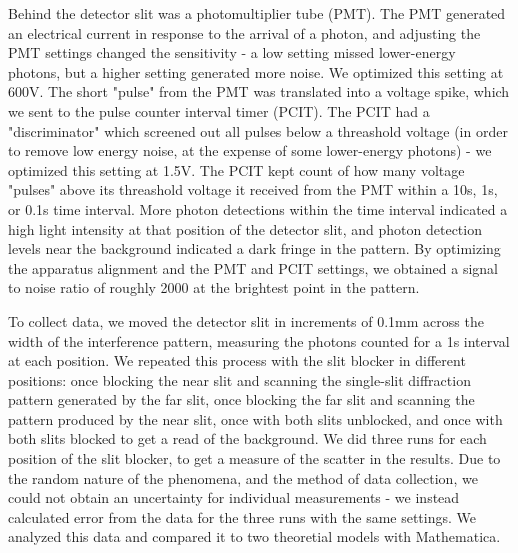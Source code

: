 \documentclass[prb,preprint]{revtex4-1}
\begin{document}
Behind the detector slit was a photomultiplier tube (PMT).  The PMT generated an electrical current in response to the arrival of a photon, and adjusting the PMT settings changed the sensitivity - a low setting missed lower-energy photons, but a higher setting generated more noise.  We optimized this setting at 600V.  The short "pulse" from the PMT was translated into a voltage spike, which we sent to the pulse counter interval timer (PCIT).  The PCIT had a "discriminator" which screened out all pulses below a threashold voltage (in order to remove low energy noise, at the expense of some lower-energy photons) - we optimized this setting at 1.5V. The PCIT kept count of how many voltage "pulses" above its threashold voltage it received from the PMT within a 10s, 1s, or 0.1s time interval. More photon detections within the time interval indicated a high light intensity at that position of the detector slit, and photon detection levels near the background indicated a dark fringe in the pattern. By optimizing the apparatus alignment and the PMT and PCIT settings, we obtained a signal to noise ratio of roughly 2000 at the brightest point in the pattern.  

To collect data, we moved the detector slit in increments of 0.1mm across the width of the interference pattern, measuring the photons counted for a 1s interval at each position.  We repeated this process with the slit blocker in different positions: once blocking the near slit and scanning the single-slit diffraction pattern generated by the far slit, once blocking the far slit and scanning the pattern produced by the near slit, once with both slits unblocked, and once with both slits blocked to get a read of the background.  We did three runs for each position of the slit blocker, to get a measure of the scatter in the results.  Due to the random nature of the phenomena, and the method of data collection, we could not obtain an uncertainty for individual measurements - we instead calculated error from the data for the three runs with the same settings.  We analyzed this data and compared it to two theoretial models with Mathematica.  
\end{document}
